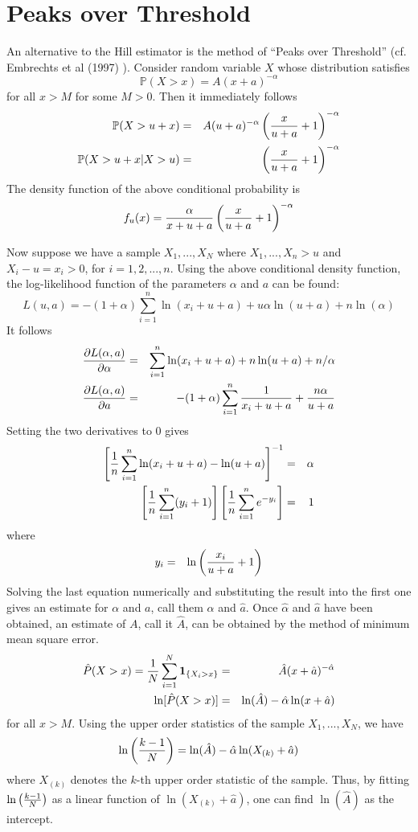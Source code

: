 \documentclass{article}
\newcommand{\pd}[2]{
  \frac{\partial #1}{\partial #2}
}
\renewcommand{\P}{
  \mathbb{P}
}
\newcommand{\1}[1]{
  \mathbf{1}_{\{#1\}}
}
\begin{document}
\section{Peaks over Threshold}
An alternative to the Hill estimator is the method of ``Peaks over
Threshold'' (cf. Embrechts et al (1997)
\cite{Embrechts1997}). Consider random variable $X$ whose distribution
satisfies 
\[
\P(X > x) = A (x + a)^{-\alpha}
\]
for all $x > M$ for some $M > 0$. Then it immediately follows
\begin{eqnarray*}
  \P(X > u + x)
  &=& A (u + a)^{-\alpha} \left(
  {x \over u + a} + 1
  \right)^{-\alpha} \\
  \P(X > u + x | X > u) &=& \left(
    {x \over u + a} + 1
    \right)^{-\alpha}
\end{eqnarray*}
The density function of the above conditional probability is
\[
f_u(x) = {
  \alpha \over x + u + a
} \left(
{x \over u + a} + 1
\right)^{-\alpha}
\]

Now suppose we have a sample $X_1, ..., X_N$ where $X_1, ..., X_n > u$
and $X_i - u = x_i > 0$, for $i=1,2,...,n$. Using the above
conditional density function, the log-likelihood function of the
parameters $\alpha$ and $a$ can be found:
\[
L(u, a) = -(1 + \alpha) \sum_{i=1}^n \ln(x_i + u + a) +
u \alpha \ln(u + a) + n \ln(\alpha)
\]
It follows
\begin{eqnarray*}
  \pd{L(\alpha, a)}{\alpha} &=& \sum_{i=1}^n \ln(x_i + u + a)
  + n \ln(u + a) + n/\alpha \\
  \pd{L(\alpha, a)}{a} &=&
  -(1 + \alpha) \sum_{i=1}^n {1 \over x_i + u + a}
  + {n \alpha \over u + a}
\end{eqnarray*}
Setting the two derivatives to 0 gives
\begin{eqnarray*}
  \left[
    {1 \over n} \sum_{i=1}^n \ln(x_i + u + a)
    - \ln(u + a)
    \right]^{-1} &=& \alpha\\
  \left[
    {1 \over n} \sum_{i=1}^n (y_i + 1)
    \right] \left[
    {1 \over n} \sum_{i=1}^n e^{-y_i}
    \right] &=& 1
\end{eqnarray*}
where
\begin{eqnarray*}
  y_i &=& \ln\left(
  {x_i \over u + a} + 1
  \right)
\end{eqnarray*}
Solving the last equation numerically and substituting the result into
the first one gives an estimate for $\alpha$ and $a$, call them $\hat
\alpha$ and $\hat a$. Once $\hat \alpha$ and $\hat a$ have been
obtained, an estimate of $A$, call it $\hat A$, can be obtained by
the method of minimum mean square error.
\begin{eqnarray*}
  \hat P(X > x) = {1 \over N} \sum_{i=1}^N \1{X_i > x}
  &=& \hat A (x + \hat a)^{-\hat \alpha} \\
  \ln[\hat P(X > x)] &=& \ln(\hat A) - \hat \alpha \ln(x + \hat a)
\end{eqnarray*}
for all $x > M$. Using the upper order statistics of the
sample $X_1, ..., X_N$, we have
\[
\ln\left({k-1 \over N}\right)
=
\ln(\hat A) - \hat \alpha \ln(X_{(k)} + \hat a)
\]
where $X_{(k)}$ denotes the $k$-th upper order statistic of the
sample. Thus, by fitting $\ln\left({k-1 \over N}\right)$ as a linear
function of $\ln(X_{(k)} + \hat a)$, one can find $\ln(\hat A)$ as the
intercept.
\end{document}
